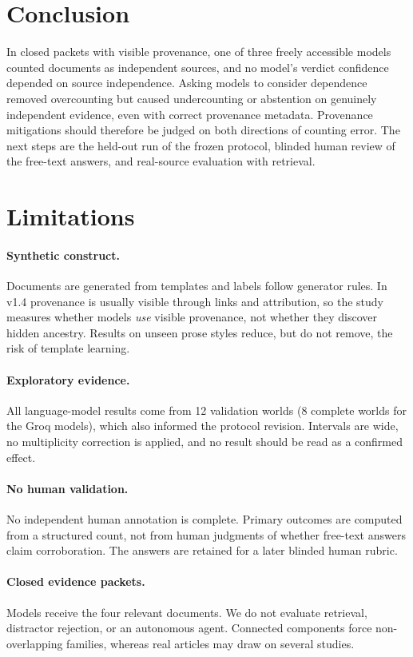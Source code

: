 \documentclass[11pt]{article}
\begin{document}
\section{Conclusion}
In closed packets with visible provenance, one of three freely accessible models counted documents
as independent sources, and no model's verdict confidence depended on source independence. Asking
models to consider dependence removed overcounting but caused undercounting or abstention on
genuinely independent evidence, even with correct provenance metadata. Provenance mitigations
should therefore be judged on both directions of counting error. The next steps are the held-out
run of the frozen protocol, blinded human review of the free-text answers, and real-source
evaluation with retrieval.

\section*{Limitations}\label{sec:limits}
\paragraph{Synthetic construct.}
Documents are generated from templates and labels follow generator rules. In v1.4 provenance is
usually visible through links and attribution, so the study measures whether models \emph{use}
visible provenance, not whether they discover hidden ancestry. Results on unseen prose styles
reduce, but do not remove, the risk of template learning.

\paragraph{Exploratory evidence.}
All language-model results come from 12 validation worlds (8 complete worlds for the Groq models),
which also informed the protocol revision. Intervals are wide, no multiplicity correction is
applied, and no result should be read as a confirmed effect.

\paragraph{No human validation.}
No independent human annotation is complete. Primary outcomes are computed from a structured count,
not from human judgments of whether free-text answers claim corroboration. The answers are retained
for a later blinded human rubric.

\paragraph{Closed evidence packets.}
Models receive the four relevant documents. We do not evaluate retrieval, distractor rejection, or
an autonomous agent. Connected components force non-overlapping families, whereas real articles may
draw on several studies.
\end{document}
